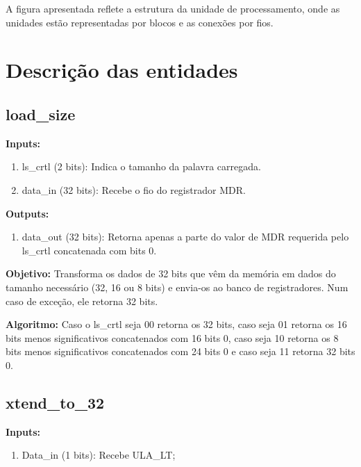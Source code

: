 A figura apresentada reflete a estrutura da unidade de processamento, onde as unidades estão representadas por blocos e as conexões por fios.

\newpage

\section{Descrição das entidades}

\subsection{load\_size}

\textbf{Inputs:}

\begin{enumerate}
    \item ls\_crtl (2 bits): Indica o tamanho da palavra carregada.
    \item data\_in (32 bits): Recebe o fio do registrador MDR.
\end{enumerate}

\textbf{Outputs:}

\begin{enumerate}
    \item data\_out (32 bits): Retorna apenas a parte do valor de MDR requerida pelo ls\_crtl concatenada com bits 0.
\end{enumerate}

\textbf{Objetivo:} Transforma os dados de 32 bits que vêm da memória em dados do tamanho necessário (32, 16 ou 8 bits) e envia-os ao banco de registradores. Num caso de exceção, ele retorna 32 bits.

\textbf{Algoritmo:} Caso o ls\_crtl seja 00 retorna os 32 bits, caso seja 01 retorna os 16 bits menos significativos concatenados com 16 bits 0, caso seja 10 retorna os 8 bits menos significativos concatenados com 24 bits 0 e caso seja 11 retorna 32 bits 0.



\subsection{xtend\_to\_32}

\textbf{Inputs:}

\begin{enumerate}
    \item Data\_in (1 bits): Recebe ULA\_LT;

\end{enumerate}

